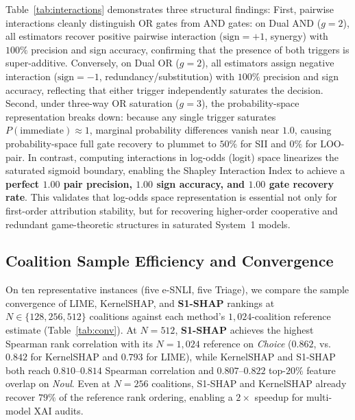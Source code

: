 \documentclass[10pt]{article}
\begin{document}
Table~\ref{tab:interactions} demonstrates three structural findings:
First, pairwise interactions cleanly distinguish OR gates from AND gates:
on Dual AND ($g=2$), all estimators recover positive pairwise interaction ($\text{sign} = +1$, synergy) with $100\%$ precision and sign accuracy, confirming that the presence of both triggers is super-additive.
Conversely, on Dual OR ($g=2$), all estimators assign negative interaction ($\text{sign} = -1$, redundancy/substitution) with $100\%$ precision and sign accuracy, reflecting that either trigger independently saturates the decision.
Second, under three-way OR saturation ($g=3$), the probability-space representation breaks down:
because any single trigger saturates $P(\text{immediate}) \approx 1$, marginal probability differences vanish near $1.0$, causing probability-space full gate recovery to plummet to $50\%$ for SII and $0\%$ for LOO-pair.
In contrast, computing interactions in log-odds (logit) space linearizes the saturated sigmoid boundary, enabling the Shapley Interaction Index to achieve a \textbf{perfect $1.00$ pair precision, $1.00$ sign accuracy, and $1.00$ gate recovery rate}.
This validates that log-odds space representation is essential not only for first-order attribution stability, but for recovering higher-order cooperative and redundant game-theoretic structures in saturated System~1 models.

\begin{table}[!htbp]
\centering
\caption{Logic gate recovery via pairwise Shapley interactions across Dual OR ($g=2$), Multi OR ($g=3$), and Dual AND ($g=2$) regimes: ground-truth trigger pair precision@$g$, logic sign accuracy ($\text{sign} = -1$ for OR redundancy; $+1$ for AND synergy), and full gate recovery rate across probability and log-odds representations.}
\label{tab:interactions}
\resizebox{\textwidth}{!}{}
\end{table}

\subsection{Coalition Sample Efficiency and Convergence}
On ten representative instances (five e-SNLI, five Triage), we compare the sample convergence of LIME, KernelSHAP, and \textbf{S1-SHAP} rankings at $N \in \{128, 256, 512\}$ coalitions against each method's $1{,}024$-coalition reference estimate (Table~\ref{tab:conv}).
At $N=512$, \textbf{S1-SHAP} achieves the highest Spearman rank correlation with its $N=1{,}024$ reference on \emph{Choice} ($0.862$, vs.\ $0.842$ for KernelSHAP and $0.793$ for LIME), while KernelSHAP and S1-SHAP both reach $0.810$--$0.814$ Spearman correlation and $0.807$--$0.822$ top-$20\%$ feature overlap on \emph{Noul}.
Even at $N=256$ coalitions, S1-SHAP and KernelSHAP already recover $79\%$ of the reference rank ordering, enabling a $2\times$ speedup for multi-model XAI audits.
\end{document}
